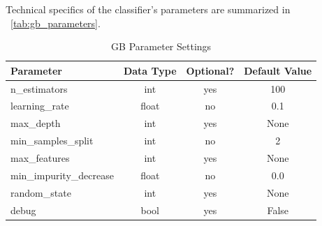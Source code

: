 \begin{appendices}
  Technical specifics of the classifier's parameters are summarized in ~\autoref{tab:gb_parameters}.

  \begin{table}[H]
    \centering
    \begin{tabular}{lccc}
      \toprule
      \textbf{Parameter}      & \textbf{Data Type} & \textbf{Optional?} & \textbf{Default Value} \\
      \midrule
      n\_estimators           & int                & yes                & 100                    \\
      learning\_rate          & float              & no                 & 0.1                    \\
      max\_depth              & int                & yes                & None                   \\
      min\_samples\_split     & int                & no                 & 2                      \\
      max\_features           & int                & yes                & None                   \\
      min\_impurity\_decrease & float              & no                 & 0.0                    \\
      random\_state           & int                & yes                & None                   \\
      debug                   & bool               & yes                & False                  \\
      \bottomrule
    \end{tabular}
    \caption{GB Parameter Settings}
    \label{tab:gb_parameters}
  \end{table}
\end{appendices}
